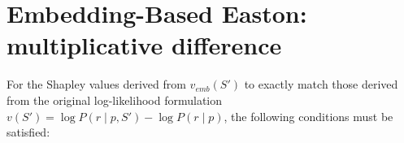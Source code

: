 \documentclass{article}
\newtheorem{remark}[theorem]{Remark}
\newtheorem{condition}{Condition}
\begin{document}

\section{Embedding-Based Easton: multiplicative difference}

For the Shapley values derived from $v_{emb}(S')$ to exactly match those derived from the original log-likelihood formulation $v(S') = \log P(r \mid p, S') - \log P(r \mid p)$, the following conditions must be satisfied:












\end{document}
